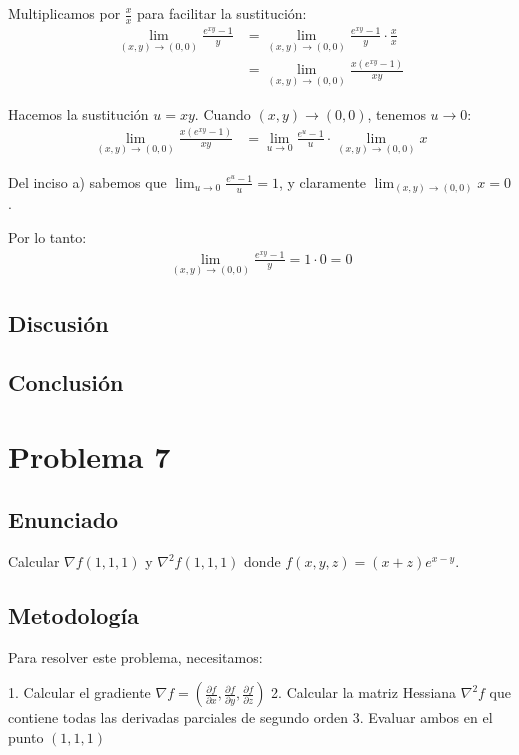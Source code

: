 \documentclass{article}
\begin{document}
Multiplicamos por $\frac{x}{x}$ para facilitar la sustitución:
\begin{align}
\lim_{(x,y) \to (0,0)} \frac{e^{xy} - 1}{y} &= \lim_{(x,y) \to (0,0)} \frac{e^{xy} - 1}{y} \cdot \frac{x}{x} \\
&= \lim_{(x,y) \to (0,0)} \frac{x(e^{xy} - 1)}{xy}
\end{align}

Hacemos la sustitución $u = xy$. Cuando $(x,y) \to (0,0)$, tenemos $u \to 0$:
\begin{align}
\lim_{(x,y) \to (0,0)} \frac{x(e^{xy} - 1)}{xy} &= \lim_{u \to 0} \frac{e^u - 1}{u} \cdot \lim_{(x,y) \to (0,0)} x
\end{align}

Del inciso a) sabemos que $\lim_{u \to 0} \frac{e^u - 1}{u} = 1$, y claramente $\lim_{(x,y) \to (0,0)} x = 0$.

Por lo tanto:
\begin{align}
\lim_{(x,y) \to (0,0)} \frac{e^{xy} - 1}{y} = 1 \cdot 0 = 0
\end{align}

\subsection{Discusión}

\subsection{Conclusión}

\section{Problema 7}

\subsection{Enunciado}
Calcular $\nabla f(1, 1, 1)$ y $\nabla^2 f(1, 1, 1)$ donde $f(x, y, z) = (x + z)e^{x-y}$.

\subsection{Metodología}

Para resolver este problema, necesitamos:

1. Calcular el gradiente $\nabla f = \left(\frac{\partial f}{\partial x}, \frac{\partial f}{\partial y}, \frac{\partial f}{\partial z}\right)$
2. Calcular la matriz Hessiana $\nabla^2 f$ que contiene todas las derivadas parciales de segundo orden
3. Evaluar ambos en el punto $(1, 1, 1)$
\end{document}
